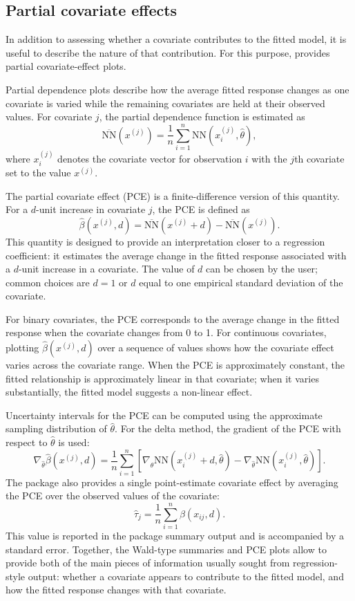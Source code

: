\subsection{Partial covariate effects}\label{partial-covariate-effects}

In addition to assessing whether a covariate contributes to the fitted model, it is useful to describe the nature of that contribution.
For this purpose,  provides partial covariate-effect plots.

Partial dependence plots describe how the average fitted response changes as one covariate is varied while the remaining covariates are held at their observed values.
For covariate \(j\), the partial dependence function is estimated as
\[
  \overline{\mathrm{NN}}(x^{(j)})
  =
  \frac{1}{n}
  \sum_{i=1}^n
  \mathrm{NN}(x_i^{(j)}, \hat{\theta}),
\]
where \(x_i^{(j)}\) denotes the covariate vector for observation \(i\) with the \(j\)th covariate set to the value \(x^{(j)}\).

The partial covariate effect (PCE) is a finite-difference version of this quantity.
For a \(d\)-unit increase in covariate \(j\), the PCE is defined as
\[
  \hat{\beta}(x^{(j)}, d)
  =
  \overline{\mathrm{NN}}(x^{(j)} + d)
  -
  \overline{\mathrm{NN}}(x^{(j)}).
\]
This quantity is designed to provide an interpretation closer to a regression coefficient: it estimates the average change in the fitted response associated with a \(d\)-unit increase in a covariate.
The value of \(d\) can be chosen by the user; common choices are \(d = 1\) or \(d\) equal to one empirical standard deviation of the covariate.

For binary covariates, the PCE corresponds to the average change in the fitted response when the covariate changes from 0 to 1.
For continuous covariates, plotting \(\hat{\beta}(x^{(j)}, d)\) over a sequence of values shows how the covariate effect varies across the covariate range.
When the PCE is approximately constant, the fitted relationship is approximately linear in that covariate; when it varies substantially, the fitted model suggests a non-linear effect.

Uncertainty intervals for the PCE can be computed using the approximate sampling distribution of \(\hat{\theta}\).
For the delta method, the gradient of the PCE with respect to \(\hat{\theta}\) is used:
\[
 \nabla_{\hat{\theta}}\hat{\beta}(x^{(j)},d)
 =
 \frac{1}{n}
 \sum_{i=1}^n
 \left[
   \nabla_{\hat{\theta}}\mathrm{NN}(x_i^{(j)} + d, \hat{\theta})
   -
   \nabla_{\hat{\theta}}\mathrm{NN}(x_i^{(j)}, \hat{\theta})
 \right].
\]
The package also provides a single point-estimate covariate effect by averaging the PCE over the observed values of the covariate:
\[
   \hat{\tau}_j
   =
   \frac{1}{n}
   \sum_{i=1}^n
   \hat{\beta}(x_{ij}, d).
\]
This value is reported in the package summary output and is accompanied by a standard error.
Together, the Wald-type summaries and PCE plots allow  to provide both of the main pieces of information usually sought from regression-style output: whether a covariate appears to contribute to the fitted model, and how the fitted response changes with that covariate.

